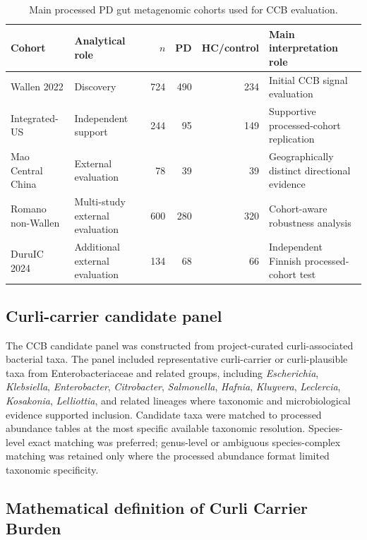 \documentclass[11pt]{article}
\begin{document}
\begin{table}[H]
\centering
\caption{Main processed PD gut metagenomic cohorts used for CCB evaluation.}
\label{tab:datasets}
\scriptsize
\begin{tabularx}{\textwidth}{>{\raggedright\arraybackslash}p{2.7cm} >{\raggedright\arraybackslash}p{2.6cm} r r r >{\raggedright\arraybackslash}X}
\toprule
Cohort & Analytical role & $n$ & PD & HC/control & Main interpretation role \\
\midrule
Wallen 2022 & Discovery & 724 & 490 & 234 & Initial CCB signal evaluation \\
Integrated-US & Independent support & 244 & 95 & 149 & Supportive processed-cohort replication \\
Mao Central China & External evaluation & 78 & 39 & 39 & Geographically distinct directional evidence \\
Romano non-Wallen & Multi-study external evaluation & 600 & 280 & 320 & Cohort-aware robustness analysis \\
DuruIC 2024 & Additional external evaluation & 134 & 68 & 66 & Independent Finnish processed-cohort test \\
\bottomrule
\end{tabularx}
\end{table}

\subsection*{Curli-carrier candidate panel}

The CCB candidate panel was constructed from project-curated curli-associated bacterial taxa. The panel included representative curli-carrier or curli-plausible taxa from Enterobacteriaceae and related groups, including \emph{Escherichia}, \emph{Klebsiella}, \emph{Enterobacter}, \emph{Citrobacter}, \emph{Salmonella}, \emph{Hafnia}, \emph{Kluyvera}, \emph{Leclercia}, \emph{Kosakonia}, \emph{Lelliottia}, and related lineages where taxonomic and microbiological evidence supported inclusion. Candidate taxa were matched to processed abundance tables at the most specific available taxonomic resolution. Species-level exact matching was preferred; genus-level or ambiguous species-complex matching was retained only where the processed abundance format limited taxonomic specificity.

\subsection*{Mathematical definition of Curli Carrier Burden}
\end{document}
